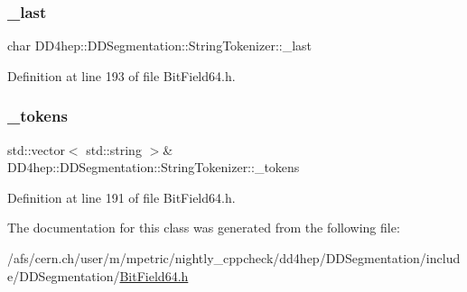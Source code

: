 \subsubsection{\texorpdfstring{\+\_\+last}{\_last}}
{\footnotesize\ttfamily char D\+D4hep\+::\+D\+D\+Segmentation\+::\+String\+Tokenizer\+::\+\_\+last\hspace{0.3cm}{\ttfamily [private]}}



Definition at line 193 of file Bit\+Field64.\+h.

\hypertarget{class_d_d4hep_1_1_d_d_segmentation_1_1_string_tokenizer_aac884d4330a88a11e4460ea9240cdb85}{}\label{class_d_d4hep_1_1_d_d_segmentation_1_1_string_tokenizer_aac884d4330a88a11e4460ea9240cdb85} 
\subsubsection{\texorpdfstring{\+\_\+tokens}{\_tokens}}
{\footnotesize\ttfamily std\+::vector$<$ std\+::string $>$\& D\+D4hep\+::\+D\+D\+Segmentation\+::\+String\+Tokenizer\+::\+\_\+tokens\hspace{0.3cm}{\ttfamily [private]}}



Definition at line 191 of file Bit\+Field64.\+h.



The documentation for this class was generated from the following file\+:\begin{DoxyCompactItemize}
\item 
/afs/cern.\+ch/user/m/mpetric/nightly\+\_\+cppcheck/dd4hep/\+D\+D\+Segmentation/include/\+D\+D\+Segmentation/\hyperlink{_d_d_segmentation_2include_2_d_d_segmentation_2_bit_field64_8h}{Bit\+Field64.\+h}\end{DoxyCompactItemize}
